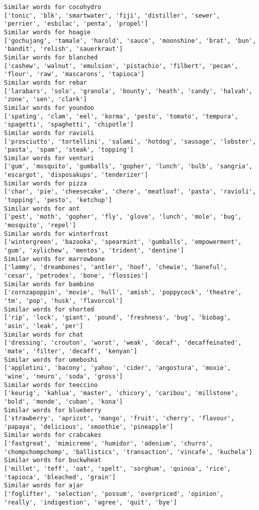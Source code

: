 \documentclass[11pt]{article}
\begin{document}
\begin{Verbatim}[commandchars=\\\{\}]
Similar words for cocohydro
['tonic', 'blk', 'smartwater', 'fiji', 'distiller', 'sewer', 'perrier', 'esbilac', 'penta', 'propel']
Similar words for hoagie
['gochujang', 'tamale', 'harold', 'sauce', 'moonshine', 'brat', 'bun', 'bandit', 'relish', 'sauerkraut']
Similar words for blanched
['cashew', 'walnut', 'emulsion', 'pistachio', 'filbert', 'pecan', 'flour', 'raw', 'mascarons', 'tapioca']
Similar words for rebar
['larabars', 'solo', 'granola', 'bounty', 'heath', 'candy', 'halvah', 'zone', 'sen', 'clark']
Similar words for youndoo
['spating', 'clam', 'eel', 'korma', 'pesto', 'tomato', 'tempura', 'spagetti', 'spaghetti', 'chipotle']
Similar words for ravioli
['prosciutto', 'tortellini', 'salami', 'hotdog', 'sausage', 'lobster', 'pasta', 'spam', 'steak', 'topping']
Similar words for venturi
['gum', 'mosquito', 'gumballs', 'gopher', 'lunch', 'bulb', 'sangria', 'escargot', 'disposakups', 'tenderizer']
Similar words for pizza
['char', 'pie', 'cheesecake', 'chere', 'meatloaf', 'pasta', 'ravioli', 'topping', 'pesto', 'ketchup']
Similar words for ant
['pest', 'moth', 'gopher', 'fly', 'glove', 'lunch', 'mole', 'bug', 'mosquito', 'repel']
Similar words for winterfrost
['wintergreen', 'bazooka', 'spearmint', 'gumballs', 'empowerment', 'gum', 'xylichew', 'mentos', 'trident', 'dentine']
Similar words for marrowbone
['lammy', 'dreambones', 'antler', 'hoof', 'chewie', 'baneful', 'cesar', 'petrodex', 'bone', 'flossies']
Similar words for bambino
['cornzapoppin', 'movie', 'hull', 'amish', 'poppycock', 'theatre', 'tm', 'pop', 'husk', 'flavorcol']
Similar words for shorted
['rip', 'lock', 'giant', 'pound', 'freshness', 'bug', 'biobag', 'asin', 'leak', 'per']
Similar words for chat
['dressing', 'crouton', 'worst', 'weak', 'decaf', 'decaffeinated', 'mate', 'filter', 'decaff', 'kenyan']
Similar words for umeboshi
['appletini', 'bacony', 'yahoo', 'cider', 'angostura', 'moxie', 'wine', 'neuro', 'soda', 'gross']
Similar words for teeccino
['keurig', 'kahlua', 'master', 'chicory', 'caribou', 'millstone', 'bold', 'monde', 'cuban', 'kona']
Similar words for blueberry
['strawberry', 'apricot', 'mango', 'fruit', 'cherry', 'flavour', 'papaya', 'delicious', 'smoothie', 'pineapple']
Similar words for crabcakes
['fastgreat', 'mimicreme', 'humidor', 'adenium', 'churro', 'chompchompchomp', 'ballistics', 'transaction', 'vincafe', 'kuchela']
Similar words for buckwheat
['millet', 'teff', 'oat', 'spelt', 'sorghum', 'quinoa', 'rice', 'tapioca', 'bleached', 'grain']
Similar words for ajar
['foglifter', 'selection', 'possum', 'overpriced', 'opinion', 'really', 'indigestion', 'agree', 'quit', 'bye']

\end{Verbatim}
\end{document}
